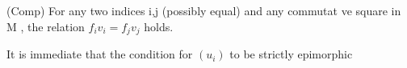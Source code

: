 (Comp) For any two indices i,j (possibly equal) and any commutat%
ve square
in M , the relation $f_iv_i = f_jv_j$ holds.

It is immediate that the condition for $(u_i)$ to be strictly epimorphic

